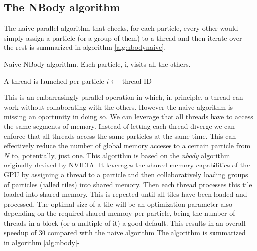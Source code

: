 \documentclass[ twoside,openright,titlepage,numbers=noenddot,%
headinclude,footinclude,cleardoublepage=empty,abstract=on,
BCOR=5mm,paper=a4,fontsize=11pt, dvipsnames
]{scrreprt}
\newcommand{\gpu}{\gls{GPU}\xspace}
\begin{document}
\subsection{The NBody algorithm}
The naive parallel algorithm that checks, for each particle, every other would simply assign a particle (or a group of them) to a thread and then iterate over the rest is summarized in algorithm \ref{alg:nbodynaive}.
\begin{algorithm}
  \caption{Naive NBody algorithm. Each particle, i, visits all the others.}\label{alg:nbodynaive}
  \begin{algorithmic}[1]
    \Require A thread is launched per particle    
    \State $i \gets$ thread ID 
    \EndFor
  \end{algorithmic}
\end{algorithm}
This is an embarrasingly parallel operation in which, in principle, a thread can work without collaborating with the others. However the naive algorithm is missing an oportunity in doing so. We can leverage that all threads have to access the same segments of memory. Instead of letting each thread diverge we can enforce that all threads access the same particles at the same time. This can effectively reduce the number of global memory acceses to a certain particle from $N$ to, potentially, just one.
This algorithm is based on the \emph{nbody} algorithm originally devised by NVIDIA\cite{nbody1,gpugems3,cudahandbook}. It leverages the shared memory capabilities of the \gpu by assigning a thread to a particle and then collaboratively loading groups of particles (called tiles) into shared memory. Then each thread processes this tile loaded into shared memory. This is repeated until all tiles have been loaded and processed.
The optimal size of a tile will be an optimization parameter also depending on the required shared memory per particle, being the number of threads in a block (or a multiple of it) a good default.
This results in an overall speedup of 30 compared with the naive algorithm 
The algorithm is summarized in algorithm \ref{alg:nbody}-
\end{document}

